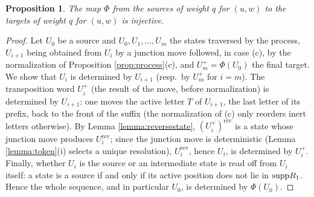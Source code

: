 \documentclass{amsart}
\newtheorem{proposition}[lemma]{Proposition}
\theoremstyle{definition}
\theoremstyle{remark}
\numberwithin{equation}{section}
\begin{document}
\begin{proposition} \label{prop:injective}
The map $\Phi$ from the sources of weight $q$ for $(u,w)$ to the targets of weight $q$ for $(u,w)$ is injective.
\end{proposition}
\begin{proof}
Let $U_0$ be a source and $U_0,U_1,\ldots,U_m$ the states traversed by the process, $U_{i+1}$ being obtained from $U_i$ by a junction move followed, in case (c), by the normalization of Proposition \ref{prop:process}(c), and $U_m^+=\Phi(U_0)$ the final target. We show that $U_i$ is determined by $U_{i+1}$ (resp.\ by $U_m^+$ for $i=m$). The transposition word $U_i^+$ (the result of the move, before normalization) is determined by $U_{i+1}$: one moves the active letter $T$ of $U_{i+1}$, the last letter of its prefix, back to the front of the suffix (the normalization of (c) only reorders inert letters otherwise). By Lemma \ref{lemma:reversestate}, $(U_i^+)^{\mathrm{rev}}$ is a state whose junction move produces $U_i^{\mathrm{rev}}$; since the junction move is deterministic (Lemma \ref{lemma:token}(i) selects a unique resolution), $U_i^{\mathrm{rev}}$, hence $U_i$, is determined by $U_i^+$. Finally, whether $U_i$ is the source or an intermediate state is read off from $U_i$ itself: a state is a source if and only if its active position does not lie in $\mathrm{supp} R_1$. Hence the whole sequence, and in particular $U_0$, is determined by $\Phi(U_0)$.
\end{proof}
\end{document}
